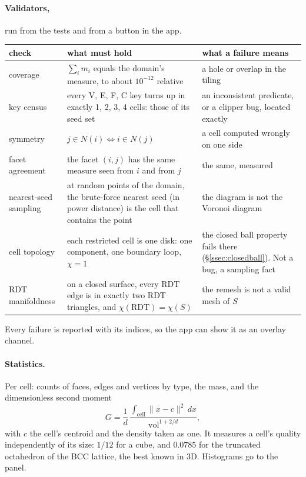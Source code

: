 \documentclass[11pt,a4paper]{article}
\newcommand{\norm}[1]{\lVert #1\rVert}
\newcommand{\secref}[1]{\S\ref{#1}}
\begin{document}
\paragraph{Validators,} run from the tests and from a button in the app.

{\small
\begin{xltabular}{\linewidth}{@{}P{2.6cm} L L@{}}
\toprule
check & what must hold & what a failure means \\
\midrule
\endhead
coverage & $\sum_i m_i$ equals the domain's measure, to about $10^{-12}$ relative
  & a hole or overlap in the tiling \\
key census & every V, E, F, C key turns up in exactly 1, 2, 3, 4 cells: those of its seed set
  & an inconsistent predicate, or a clipper bug, located exactly \\
symmetry & $j \in N(i) \iff i \in N(j)$ & a cell computed wrongly on one side \\
facet agreement & the facet $(i,j)$ has the same measure seen from $i$ and from $j$
  & the same, measured \\
nearest-seed sampling & at random points of the domain, the brute-force nearest seed (in power
  distance) is the cell that contains the point & the diagram is not the Voronoi diagram \\
cell topology & each restricted cell is one disk: one component, one boundary loop,
  $\chi = 1$ & the closed ball property fails there (\secref{ssec:closedball}). Not a bug, a
  sampling fact \\
RDT manifoldness & on a closed surface, every RDT edge is in exactly two RDT triangles, and
  $\chi(\text{RDT}) = \chi(S)$ & the remesh is not a valid mesh of $S$ \\
\bottomrule
\end{xltabular}}

Every failure is reported with its indices, so the app can show it as an overlay channel.

\paragraph{Statistics.} Per cell: counts of faces, edges and vertices by type, the mass, and the
dimensionless second moment
\[
  G = \frac{1}{d}\,\frac{\int_{\text{cell}} \norm{x - c}^2\,dx}{\operatorname{vol}^{1+2/d}},
\]
with $c$ the cell's centroid and the density taken as one. It measures a cell's quality
independently of its size: $1/12$ for a cube, and $0.0785$ for the truncated octahedron of the
BCC lattice, the best known in 3D. Histograms go to the panel.
\end{document}
